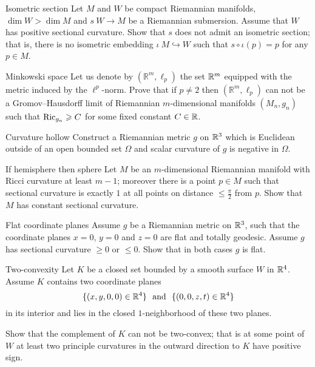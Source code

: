 \documentclass[twoside]{book}
\begin{document}
\begin{pr}{\hard}{Isometric section}\label{Isometric section}
Let $M$ and $W$ be compact Riemannian manifolds,
$\dim W>\dim M$
and $s\:W\to M$ be a Riemannian submersion.
Assume that $W$ has positive sectional curvature.
Show that $s$ does not admit an isometric section;
that is, there is no isometric embedding $\iota\:M\hookrightarrow W$ such that $s\circ\iota(p)=p$ for any $p\in M$.
\end{pr}


\begin{pr}{\many}{Minkowski space}\label{pr:Minkowski space}
Let us denote by $(\mathbb R^m,\ell_p)$ the set $\mathbb{R}^m$ equipped with the metric induced by the $\ell^p$-norm.
Prove that if $p\not=2$ then $(\mathbb R^m,\ell_p)$ can not be a
Gromov--Hausdorff limit of
Riemannian $m$-dimensional manifolds $(M_n,g_n)$ such that $\Ric_{g_n}\z\ge C$ for some fixed constant $C\in\mathbb{R}$.
\end{pr}

\begin{pr}{}{Curvature hollow}\label{Curvature hollow}
 Construct a Riemannian metric $g$ on $\mathbb{R}^3$ which is Euclidean outside of an open bounded set $\Omega$ and scalar curvature of $g$ is negative in $\Omega$.
\end{pr}

\begin{pr}{\thm}{If hemisphere then sphere}\label{hS=>S} 
Let $M$ be an $m$-dimensional Riemannian manifold with Ricci curvature at least $m-1$;
moreover there is a point $p\in M$ such that sectional curvature is exactly $1$ at all points on distance $\le \tfrac\pi2$ from $p$.
Show that $M$ has constant sectional curvature.
\end{pr}

\begin{pr}{}{Flat coordinate planes}\label{Flat coordinate planes}
Assume $g$ be a Riemannian metric on $\mathbb{R}^3$,
such that the coordinate planes $x=0$, $y=0$ and $z=0$ are flat and totally geodesic.
Assume $g$ has sectional curvature $\ge 0$ or $\le 0$.
Show that in both cases $g$ is flat. 
\end{pr}

\begin{pr}{\many}{Two-convexity}\label{Two-convexity}
Let $K$ be a closed set bounded by a smooth surface $W$
in $\mathbb{R}^4$.
Assume $K$ contains two coordinate planes $$\{(x,y,0,0)\in\RR^4\}\ \ 
\text{and}
\ \ \{(0,0,z,t)\in\RR^4\}$$
in its interior 
and lies in the closed $1$-neighborhood of these two planes.

Show that the complement of $K$ can not be two-convex;
that is at some point of $W$ at least two principle curvatures in the outward direction to $K$
have positive sign.
\end{pr}
\end{document}
